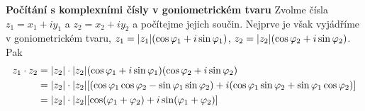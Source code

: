 \wikitextrule
\begin{example}\label{mai:exam079}
  \textbf{Počítání s komplexními čísly v goniometrickém tvaru}\newline\small
    Zvolme čísla \(z_1 = x_1 + iy_1\) a \(z_2 = x_2 + iy_2\) a počítejme jejich součin. Nejprve je 
    však vyjádříme v goniometrickém tvaru, \(z_1 =\lvert z_1\rvert(\cos\varphi_1 + i\sin\varphi_1)\), 
    \(z_2 =\lvert z_2\rvert(\cos\varphi_2 + i\sin\varphi_2)\). Pak
    \begin{align*}
      z_1\cdot z_2 &= \lvert z_2\rvert\cdot\lvert z_2\rvert(\cos\varphi_1 + i\sin\varphi_1)
                                             (\cos\varphi_2 + i\sin\varphi_2)                 \\
                   &= \lvert z_2\rvert\cdot\lvert z_2\rvert
                       [(\cos\varphi_1\cos\varphi_2 - \sin\varphi_1\sin\varphi_2) + 
                       i(\cos\varphi_1\sin\varphi_2 + \sin\varphi_1\cos\varphi_2)]            \\
                   &= \lvert z_2\rvert\cdot\lvert z_2\rvert
                       [\cos(\varphi_1 +\varphi_2) + i\sin(\varphi_1 +\varphi_2)]
    \end{align*}
  \normalsize
\end{example}